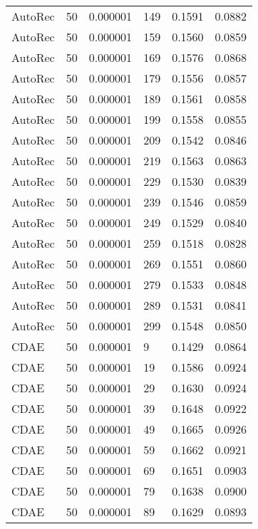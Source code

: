 \begin{tabular}{llrlrr}
 AutoRec &   50 &  0.000001 &   149 &  0.1591 &       0.0882 \\
 AutoRec &   50 &  0.000001 &   159 &  0.1560 &       0.0859 \\
 AutoRec &   50 &  0.000001 &   169 &  0.1576 &       0.0868 \\
 AutoRec &   50 &  0.000001 &   179 &  0.1556 &       0.0857 \\
 AutoRec &   50 &  0.000001 &   189 &  0.1561 &       0.0858 \\
 AutoRec &   50 &  0.000001 &   199 &  0.1558 &       0.0855 \\
 AutoRec &   50 &  0.000001 &   209 &  0.1542 &       0.0846 \\
 AutoRec &   50 &  0.000001 &   219 &  0.1563 &       0.0863 \\
 AutoRec &   50 &  0.000001 &   229 &  0.1530 &       0.0839 \\
 AutoRec &   50 &  0.000001 &   239 &  0.1546 &       0.0859 \\
 AutoRec &   50 &  0.000001 &   249 &  0.1529 &       0.0840 \\
 AutoRec &   50 &  0.000001 &   259 &  0.1518 &       0.0828 \\
 AutoRec &   50 &  0.000001 &   269 &  0.1551 &       0.0860 \\
 AutoRec &   50 &  0.000001 &   279 &  0.1533 &       0.0848 \\
 AutoRec &   50 &  0.000001 &   289 &  0.1531 &       0.0841 \\
 AutoRec &   50 &  0.000001 &   299 &  0.1548 &       0.0850 \\
    CDAE &   50 &  0.000001 &     9 &  0.1429 &       0.0864 \\
    CDAE &   50 &  0.000001 &    19 &  0.1586 &       0.0924 \\
    CDAE &   50 &  0.000001 &    29 &  0.1630 &       0.0924 \\
    CDAE &   50 &  0.000001 &    39 &  0.1648 &       0.0922 \\
    CDAE &   50 &  0.000001 &    49 &  0.1665 &       0.0926 \\
    CDAE &   50 &  0.000001 &    59 &  0.1662 &       0.0921 \\
    CDAE &   50 &  0.000001 &    69 &  0.1651 &       0.0903 \\
    CDAE &   50 &  0.000001 &    79 &  0.1638 &       0.0900 \\
    CDAE &   50 &  0.000001 &    89 &  0.1629 &       0.0893 \\

\end{tabular}
